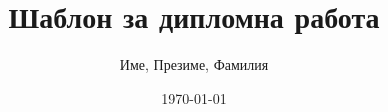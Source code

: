 \documentclass[]{elsys_diploma_project}
\title{Шаблон за дипломна работа}
\author{Име, Презиме, Фамилия}
\date{\today}
\begin{document}
\maketitle



\cleardoublepage








\nocite{soviet_ics}
\nocite{rechniko}
\printbibliography

\tableofcontents
\listoffigures
\listoftables
\vfill
\pagebreak

\appendix

\end{document}
